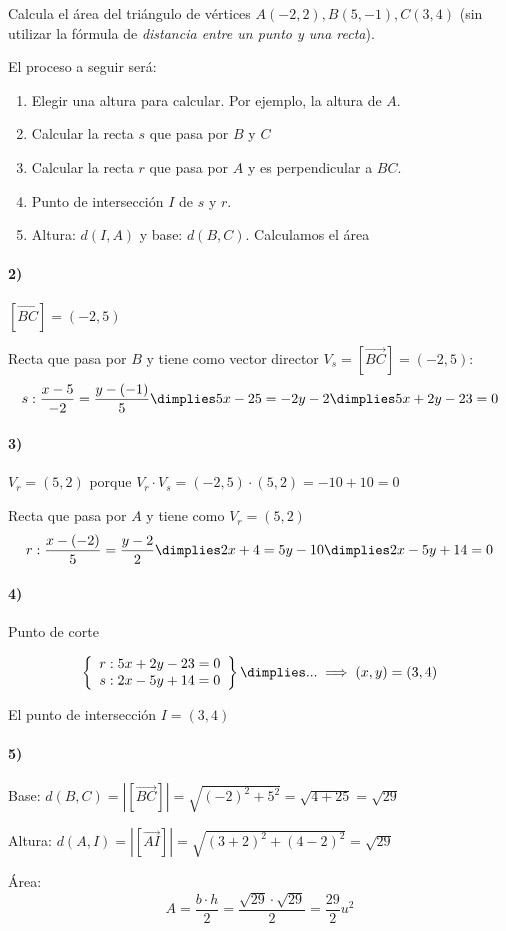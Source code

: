 \documentclass[palatino,nosec,nochap,nobuilddate]{Docencia}
\begin{document}
\newpage
\begin{problem}[108]
Calcula el área del triángulo de vértices $A(-2,2), B(5,-1), C(3,4)$ (sin utilizar la fórmula de \textit{distancia entre un punto y una recta}).

\solution

El proceso a seguir será:

\begin{enumerate}
	\item Elegir una altura para calcular. Por ejemplo, la altura de $A$.
	\item Calcular la recta $s$ que pasa por $B$ y $C$
	\item Calcular la recta $r$ que pasa por $A$ y es perpendicular a $BC$.
	\item Punto de intersección $I$ de $s$ y $r$.
	\item Altura: $d(I,A)$ y base: $d(B,C)$. Calculamos el área
\end{enumerate}

\paragraph{2)}
$[\overrightarrow{BC}] = (-2,5)$

Recta que pasa por $B$ y tiene como vector director $V_s = [\overrightarrow{BC}] = (-2,5)$:
\[
	s: \frac{x-5}{-2} = \frac{y-(-1)}{5} \dimplies 5x-25 = -2y-2 \dimplies 5x+2y-23 = 0
\]

\paragraph{3)}
$V_r = (5,2)$ porque $V_r·V_s = (-2,5)·(5,2) = -10+10 = 0$

Recta que pasa por $A$ y tiene como $V_r = (5,2)$
\[
	r: \frac{x-(-2)}{5} = \frac{y-2}{2} \dimplies 2x+4=5y-10 \dimplies 2x-5y+14=0
\]

\paragraph{4)} Punto de corte

\[
\left\{
	\begin{array}{c}
		r: 5x+2y-23 = 0\\
		s: 2x-5y+14=0
	\end{array}
\right\} \dimplies ... \implies (x,y) = \left(3,4\right)
\]

El punto de intersección $I = \left(3,4\right)$

\paragraph{5)}

Base: $d(B,C) = |[\overrightarrow{BC}]| = \sqrt{(-2)^2+5^2} = \sqrt{4+25} = \sqrt{29}$

Altura: $d(A,I) = |[\overrightarrow{AI}]| = \sqrt{\left(3+2\right)^2 + \left(4-2\right)^2} = \sqrt{29}$

Área: 
\[A=\frac{b·h}{2} = \frac{\sqrt{29}·\sqrt{29}}{2} = \frac{29}{2}u^2 \]
\end{problem}
\end{document}
